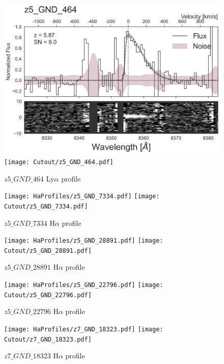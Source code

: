 \documentclass[12pt,english]{article}
\begin{document}
\clearpage
\begin{figure}
\begin{center}\includegraphics[width=12cm, trim=0.1cm 0cm 0cm -1cm]{LyaProfiles/z5_GND_464.png}
\texttt{[image: Cutout/z5\_GND\_464.pdf]}
\caption{$z5\_GND\_464$ Ly$\alpha$ profile}
\end{center}
\end{figure}
\clearpage
\begin{figure}
\begin{center}\texttt{[image: HaProfiles/z5\_GND\_7334.pdf]}
\texttt{[image: Cutout/z5\_GND\_7334.pdf]}
\caption{$z5\_GND\_7334$ H$\alpha$ profile}
\end{center}
\end{figure}
\clearpage
\begin{figure}
\begin{center}\texttt{[image: HaProfiles/z5\_GND\_28891.pdf]}
\texttt{[image: Cutout/z5\_GND\_28891.pdf]}
\caption{$z5\_GND\_28891$ H$\alpha$ profile}
\end{center}
\end{figure}
\clearpage
\begin{figure}
\begin{center}\texttt{[image: HaProfiles/z5\_GND\_22796.pdf]}
\texttt{[image: Cutout/z5\_GND\_22796.pdf]}
\caption{$z5\_GND\_22796$ H$\alpha$ profile}
\end{center}
\end{figure}
\clearpage
\begin{figure}
\begin{center}\texttt{[image: HaProfiles/z7\_GND\_18323.pdf]}
\texttt{[image: Cutout/z7\_GND\_18323.pdf]}
\caption{$z7\_GND\_18323$ H$\alpha$ profile}
\end{center}
\end{figure}
\end{document}
